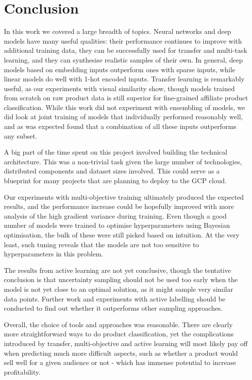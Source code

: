 \chapter{Conclusion}
\label{sum}

In this work we covered a large breadth of topics.
Neural networks and deep models have many useful qualities: their performance continues to improve with additional training data, they can be successfully used for transfer and multi-task learning, and they can synthesise realistic samples of their own.
In general, deep models based on embedding inputs outperform ones with sparse inputs, while linear models do well with 1-hot encoded inputs.
Transfer learning is remarkably useful, as our experiments with visual similarity show, though models trained from scratch on raw product data is still superior for fine-grained affiliate product classification.
While this work did not experiment with ensembling of models, we did look at joint training of models that individually performed reasonably well, and as was expected found that a combination of all these inputs outperforms any subset.

A big part of the time spent on this project involved building the technical architecture.
This was a non-trivial task given the large number of technologies, distributed components and dataset sizes involved.
This could serve as a blueprint for many projects that are planning to deploy to the GCP cloud.

Our experiments with multi-objective training ultimately produced the expected results, and the performance increase could be hopefully improved with more analysis of the high gradient variance during training.
Even though a good number of models were trained to optimise hyperparameters using Bayesian optimisation, the bulk of these were still picked based on intuition.
At the very least, such tuning reveals that the models are not too sensitive to hyperparameters in this problem.

The results from active learning are not yet conclusive, though the tentative conclusion is that uncertainty sampling should not be used too early when the model is not yet close to an optimal solution, as it might sample very similar data points.
Further work and experiments with active labelling should be conducted to find out whether it outperforms other sampling approaches.

Overall, the choice of tools and approaches was reasonable.
There are clearly more straightforward ways to do product classification, yet the complications introduced by transfer, multi-objective and active learning will most likely pay off when predicting much more difficult aspects, such as whether a product would sell well for a given audience or not - which has immense potential to increase profitability.


